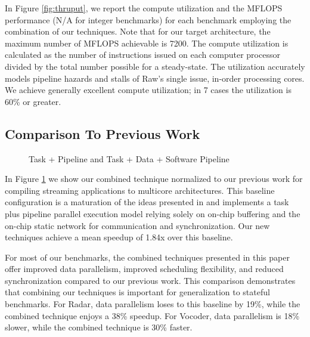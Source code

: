 In Figure \ref{fig:thruput}, we report the compute utilization and the
MFLOPS performance (N/A for integer benchmarks) for each benchmark
employing the combination of our techniques. Note that for our target
architecture, the maximum number of MFLOPS achievable is 7200.  The
compute utilization is calculated as the number of instructions issued
on each computer processor divided by the total number possible for a
steady-state.  The utilization accurately models pipeline hazards and
stalls of Raw's single issue, in-order processing cores.  We achieve
generally excellent compute utilization; in 7 cases the utilization is
60\% or greater.


\subsection{Comparison To Previous Work}

\begin{figure}[t]
\centering
{}
\caption{Task + Pipeline and Task + Data + Software Pipeline
\protect\label{fig:vs-space}}
\end{figure}

\begin{figure*}[t]
\centering
{}
\caption{Comparison and Task + Data + Software Pipeline Performance Results
\protect\label{fig:thruput}}
\end{figure*}
In Figure \ref{fig:vs-space} we show our combined technique normalized
to our previous work for compiling streaming applications to multicore
architectures.  This baseline configuration is a maturation of the
ideas presented in \cite{streamit-asplos} and implements a task plus
pipeline parallel execution model relying solely on on-chip buffering
and the on-chip static network for communication and
synchronization. Our new techniques achieve a mean speedup of 1.84x
over this baseline.  

For most of our benchmarks, the combined techniques presented in this
paper offer improved data parallelism, improved scheduling
flexibility, and reduced synchronization compared to our previous
work. This comparison demonstrates that combining our techniques is
important for generalization to stateful benchmarks.  For Radar, data
parallelism loses to this baseline by 19\%, while the combined
technique enjoys a 38\% speedup. For Vocoder, data parallelism is 18\%
slower, while the combined technique is 30\% faster.

